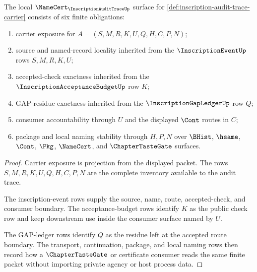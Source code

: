 \begin{theorem}
\label{thm:inscription-audit-trace-namecert-obligations}
The local $\NameCert_{\InscriptionAuditTraceUp}$ surface for \autoref{def:inscription-audit-trace-carrier} consists of six finite obligations:
\begin{enumerate}
\item carrier exposure for $A=(S,M,R,K,U,Q,H,C,P,N)$;
\item source and named-record locality inherited from the $\InscriptionEventUp$ rows $S,M,R,K,U$;
\item accepted-check exactness inherited from the $\InscriptionAcceptanceBudgetUp$ row $K$;
\item GAP-residue exactness inherited from the $\InscriptionGapLedgerUp$ row $Q$;
\item consumer accountability through $U$ and the displayed $\Cont$ routes in $C$;
\item package and local naming stability through $H,P,N$ over $\BHist$, $\hsame$, $\Cont$, $\Pkg$, $\NameCert$, and $\ChapterTasteGate$ surfaces.
\end{enumerate}
\end{theorem}
\begin{proof}
Carrier exposure is projection from the displayed packet. The rows $S,M,R,K,U,Q,H,C,P,N$ are the complete inventory available to the audit trace.

The inscription-event rows supply the source, name, route, accepted-check, and consumer boundary. The acceptance-budget rows identify $K$ as the public check row and keep downstream use inside the consumer surface named by $U$.

The GAP-ledger rows identify $Q$ as the residue left at the accepted route boundary. The transport, continuation, package, and local naming rows then record how a $\ChapterTasteGate$ or certificate consumer reads the same finite packet without importing private agency or host process data.
\end{proof}


